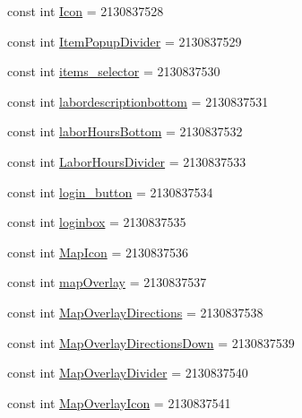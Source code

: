 \begin{DoxyCompactItemize}
\item 
const int \hyperlink{class_field_service_1_1_android_1_1_resource_1_1_drawable_a63c99dd4c9f6121a5b9fad687d5e1164}{Icon} = 2130837528
\item 
const int \hyperlink{class_field_service_1_1_android_1_1_resource_1_1_drawable_aae179590126ad299abb97c5a0b384e26}{Item\+Popup\+Divider} = 2130837529
\item 
const int \hyperlink{class_field_service_1_1_android_1_1_resource_1_1_drawable_ab39175b04635d12c31f8b8d9a64e8789}{items\+\_\+selector} = 2130837530
\item 
const int \hyperlink{class_field_service_1_1_android_1_1_resource_1_1_drawable_ab87c13816b17d4463b99bdc29979a7bb}{labordescriptionbottom} = 2130837531
\item 
const int \hyperlink{class_field_service_1_1_android_1_1_resource_1_1_drawable_a7546a2050fef83a8986cd372ebc03c0a}{labor\+Hours\+Bottom} = 2130837532
\item 
const int \hyperlink{class_field_service_1_1_android_1_1_resource_1_1_drawable_ac2c41a3e15d0998d2a24ae1acf37ea8d}{Labor\+Hours\+Divider} = 2130837533
\item 
const int \hyperlink{class_field_service_1_1_android_1_1_resource_1_1_drawable_a8eb2968d8fff4046e8171200fdbf1b23}{login\+\_\+button} = 2130837534
\item 
const int \hyperlink{class_field_service_1_1_android_1_1_resource_1_1_drawable_a15defe00064494f9f76640d61bef6d05}{loginbox} = 2130837535
\item 
const int \hyperlink{class_field_service_1_1_android_1_1_resource_1_1_drawable_acc2381158d7aa72bda307cff3e9fc875}{Map\+Icon} = 2130837536
\item 
const int \hyperlink{class_field_service_1_1_android_1_1_resource_1_1_drawable_a8003fb13b631bdac53acf390e3606302}{map\+Overlay} = 2130837537
\item 
const int \hyperlink{class_field_service_1_1_android_1_1_resource_1_1_drawable_a78b11f76e670ff6ee2e9b4f1ae1fb3bc}{Map\+Overlay\+Directions} = 2130837538
\item 
const int \hyperlink{class_field_service_1_1_android_1_1_resource_1_1_drawable_aa3319a6bd62e568d52f89860d7c5abd4}{Map\+Overlay\+Directions\+Down} = 2130837539
\item 
const int \hyperlink{class_field_service_1_1_android_1_1_resource_1_1_drawable_a58d94f9a6fd3d6d54fd7708ab6bcbbd7}{Map\+Overlay\+Divider} = 2130837540
\item 
const int \hyperlink{class_field_service_1_1_android_1_1_resource_1_1_drawable_aedbf9456d2d7dd761bef269fd7a59356}{Map\+Overlay\+Icon} = 2130837541

\end{DoxyCompactItemize}
